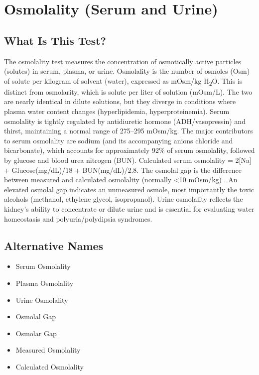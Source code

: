 \chapter{Osmolality (Serum and Urine)}

\section*{What Is This Test?}
The osmolality test measures the concentration of osmotically active particles (solutes) in serum, plasma, or urine. Osmolality is the number of osmoles (Osm) of solute per kilogram of solvent (water), expressed as mOsm/kg H\textsubscript{2}O. This is distinct from osmolarity, which is solute per liter of solution (mOsm/L). The two are nearly identical in dilute solutions, but they diverge in conditions where plasma water content changes (hyperlipidemia, hyperproteinemia). Serum osmolality is tightly regulated by antidiuretic hormone (ADH/vasopressin) and thirst, maintaining a normal range of 275--295 mOsm/kg. The major contributors to serum osmolality are sodium (and its accompanying anions chloride and bicarbonate), which accounts for approximately 92\% of serum osmolality, followed by glucose and blood urea nitrogen (BUN). Calculated serum osmolality = 2[Na] + Glucose(mg/dL)/18 + BUN(mg/dL)/2.8. The osmolal gap is the difference between measured and calculated osmolality (normally <10 mOsm/kg) \cite{wallach2022interpretation}. An elevated osmolal gap indicates an unmeasured osmole, most importantly the toxic alcohols (methanol, ethylene glycol, isopropanol). Urine osmolality reflects the kidney's ability to concentrate or dilute urine and is essential for evaluating water homeostasis and polyuria/polydipsia syndromes.

\section*{Alternative Names}
\begin{itemize}
  \item Serum Osmolality
  \item Plasma Osmolality
  \item Urine Osmolality
  \item Osmolal Gap
  \item Osmolar Gap
  \item Measured Osmolality
  \item Calculated Osmolality
\end{itemize}
